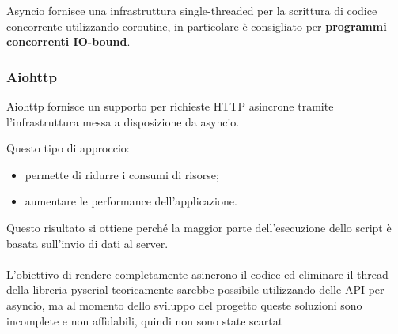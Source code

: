 Asyncio fornisce una infrastruttura single-threaded per la scrittura di codice concorrente utilizzando coroutine, in particolare è consigliato per \textbf{programmi concorrenti IO-bound}. 

\subsubsection{Aiohttp}
Aiohttp fornisce un supporto per richieste HTTP asincrone tramite l'infrastruttura messa a disposizione da asyncio.

Questo tipo di approccio:
\begin{itemize}
	\item permette di ridurre i consumi di risorse;
	\item aumentare le performance dell'applicazione.
\end{itemize}
Questo risultato si ottiene perché la maggior parte dell'esecuzione dello script è basata sull'invio di dati al server.\\\\
L'obiettivo di rendere completamente asincrono il codice ed eliminare il thread della libreria pyserial teoricamente sarebbe possibile utilizzando delle API per asyncio, ma al momento dello sviluppo del progetto queste soluzioni sono incomplete e non affidabili, quindi non sono state scartat
